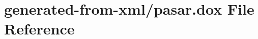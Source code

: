 \hypertarget{pasar_8dox}{}\section{generated-\/from-\/xml/pasar.dox File Reference}
\label{pasar_8dox}
